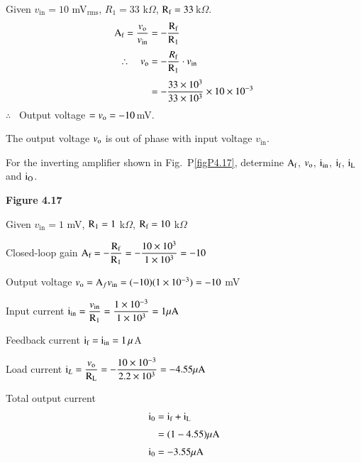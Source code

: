 \begin{solution}
Given $v_{\text{in}}=10$ mV$_{\text{rms}}$, $R_{1}=33$ k$\Omega$, $\textrm{R}_{\textrm{f}}=33$\,k$\Omega$.
\begin{align*}
\textrm{A}_{\textrm{f}} = \frac{v_{\textrm{o}}}{v_{\text{in}}} &= -\frac{\textrm{R}_{\textrm{f}}}{\textrm{R}_{1}}\\[3pt]
\therefore\quad v_{\textrm{o}} &= -\frac{R_{\textrm{f}}}{\textrm{R}_{1}}\cdot v_{\text{in}}\\[3pt]
&= -\frac{33\times 10^{3}}{33\times 10^{3}}\times 10\times 10^{-3}
\end{align*}
$\therefore$~ Output voltage $=v_{\textrm{o}}=-10$\,mV.

The output voltage $v_{\textrm{o}}$ is out of phase with input voltage $v_{\text{in}}$.
\end{solution}

\begin{problem}\label{prob4.17}
For the inverting amplifier shown in Fig.~P\ref{figP4.17}, determine $\textrm{A}_{\textrm{f}}$, $v_{\textrm{o}}$, $\textrm{i}_{\text{in}}$, $\textrm{i}_{\textrm{f}}$, $\textrm{i}_{\textrm{L}}$ and $\textrm{i}_{\textrm{O}}$.
\begin{center}
{\bf Figure 4.17}
\end{center}
\end{problem}

\begin{solution}
Given $v_{\text{in}}=1$ mV, $\textrm{R}_{1}=1$ k$\Omega$, $\textrm{R}_{\textrm{f}}=10$ k$\Omega$

\medskip
Closed-loop gain $\textrm{A}_{\textrm{f}}=-\dfrac{\textrm{R}_{\textrm{f}}}{\textrm{R}_{1}}=-\dfrac{10\times 10^{3}}{1\times 10^{3}}=-10$

\medskip
Output voltage $v_{\textrm{o}}=\textrm{A}_{f}v_{\text{in}}=(-10)(1\times 10^{-3})=-10$ mV

\medskip
Input current $\textrm{i}_{\text{in}}=\dfrac{v_{\text{in}}}{\textrm{R}_{1}}=\dfrac{1\times 10^{-3}}{1\times 10^{3}}=1\mu\textrm{A}$

\medskip
Feedback current $\textrm{i}_{\textrm{f}}=\textrm{i}_{\text{in}}=1\,\mu$A

\medskip
Load current $\textrm{i}_{L}=\dfrac{v_{\textrm{o}}}{\textrm{R}_{\textrm{L}}}=-\dfrac{10\times 10^{-3}}{2.2\times 10^{3}}=-4.55\mu\textrm{A}$

\medskip
Total output current
\begin{align*}
\textrm{i}_{0} &= \textrm{i}_{\textrm{f}}+\textrm{i}_{\textrm{L}}\\[3pt]
&= (1-4.55)\mu\textrm{A}\\[3pt]
\textrm{i}_{0} &= -3.55\mu\textrm{A}
\end{align*}
\end{solution}

